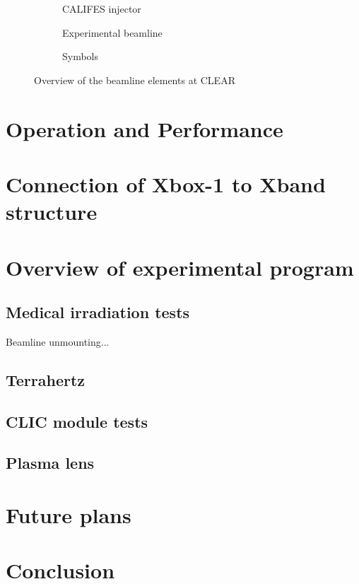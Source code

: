 \documentclass[a4paper,
               keeplastbox,   %
               ]{jacow}
\begin{document}
\begin{figure*}
    \centering
    \begin{subfigure}[h]{\textwidth}
        \centering
        
        \caption{CALIFES injector}
    \end{subfigure}
    \begin{subfigure}[h]{\textwidth}
        \centering
        
        \caption{Experimental beamline}
    \end{subfigure}
    \begin{subfigure}[h]{\textwidth}
        \centering
        
        \caption{Symbols}
    \end{subfigure}
    \caption{Overview of the beamline elements at CLEAR}
\end{figure*}

\section{Operation and Performance}

\section{Connection of Xbox-1 to Xband structure}

\section{Overview of experimental program}

\subsection{Medical irradiation tests}
Beamline unmounting...

\subsection{Terrahertz}

\subsection{CLIC module tests}
\subsection{Plasma lens}

\section{Future plans}

\section{Conclusion}
\end{document}
